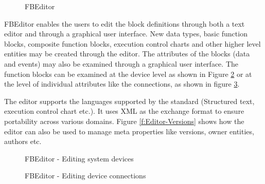 %
\begin{figure}
\begin{center}
\caption[FBEditor]{FBEditor{\protect ~\cite{FBEditor}}}
\label{f:FBEditor}
\end{center}
\end{figure}
%

FBEditor enables the users to edit the block definitions through
both a text editor and through a graphical user interface. New
data types, basic function blocks, composite function blocks,
execution control charts and other higher level entities may be
created through the editor. The attributes of the blocks (data and
events) may also be examined through a graphical user interface.
The function blocks can be examined at the device level as shown
in Figure \ref{f:Editor-Devices} or at the level of individual
attributes like the connections, as shown in figure
\ref{f:Editor-Mapping}.

The editor supports the languages supported by the standard
(Structured text, execution control chart etc.). It uses XML as
the exchange format to ensure portability across various domains.
Figure \ref{f:Editor-Versions} shows how the editor can also be
used to manage meta properties like versions, owner entities,
authors etc.

%
\begin{figure}
\begin{center}
 \caption[FBEditor
- Editing system devices]{FBEditor - Editing system
devices{\protect ~\cite{FBEditor}}} \label{f:Editor-Devices}
\end{center}
\end{figure}
%

%
\begin{figure}
\begin{center}
 \caption[FBEditor
- Editing device connections]{FBEditor - Editing device
connections{\protect ~\cite{FBEditor}}} \label{f:Editor-Mapping}
\end{center}
\end{figure}
%

